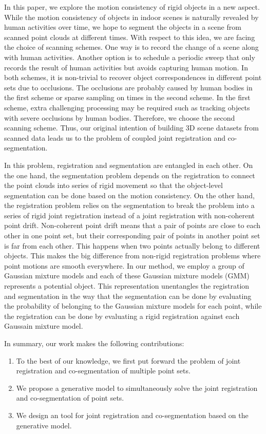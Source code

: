 In this paper, we explore the motion consistency of rigid objects in a new aspect.
While the motion consistency of objects in indoor scenes is naturally revealed by human activities over time, we hope to segment the objects in a scene from scanned point clouds at different times. 
%
With respect to this idea, we are facing the choice of scanning schemes. One way is to record the change of a scene along with human activities. Another option is to schedule a periodic sweep that only records the result of human activities but avoids capturing human motion. 
In both schemes, it is non-trivial to recover object correspondences in different point sets due to occlusions.
The occlusions are probably caused by human bodies in the first scheme or sparse sampling on times in the second scheme. 
%
In the first scheme, extra challenging processing may be required such as tracking objects with severe occlusions by human bodies. Therefore, we choose the second scanning scheme. 
Thus, our original intention of building 3D scene datasets from scanned data leads us to the problem of coupled joint registration and co-segmentation.

In this problem, registration and segmentation are entangled in each other. On the one hand, the segmentation problem depends on the registration to connect the point clouds into series of rigid movement so that the object-level segmentation can be done based on the motion consistency. 
On the other hand, the registration problem relies on the segmentation to break the problem into a series of rigid joint registration instead of a joint registration with non-coherent point drift. 
%
Non-coherent point drift means that a pair of points are close to each other in one point set, but their corresponding pair of points in another point set is far from each other. 
This happens when two points actually belong to different objects.
%
This makes the big difference from non-rigid registration problems where point motions are smooth everywhere.
%
In our method, we employ a group of Gaussian mixture models and each of these Gaussian mixture models (GMM) represents a potential object. 
This representation unentangles the registration and segmentation in the way that the segmentation can be done by evaluating the probability of belonging to the Gaussian mixture models for each point, while the registration can be done by evaluating a rigid registration  against each Gaussain mixture model.


In summary, our work makes the following contributions: 
\begin{enumerate}
	\item To the best of our knowledge, we first put forward the problem of joint registration and co-segmentation of multiple point sets.
	
	\item We propose a generative model to simultaneously solve the joint registration and co-segmentation of point sets.
	
	\item We design an  tool for joint registration and co-segmentation based on the generative model. 
\end{enumerate}